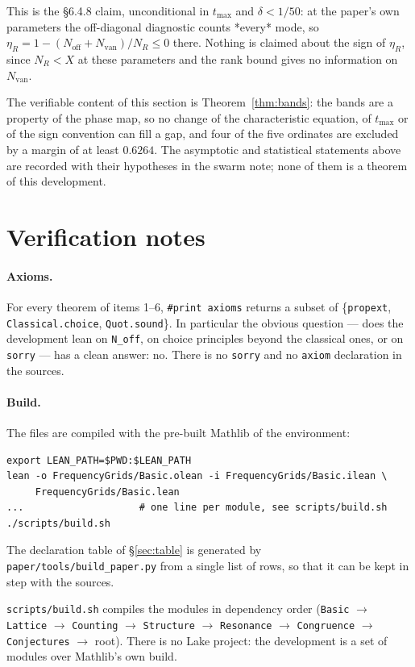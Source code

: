 \documentclass[11pt,a4paper]{article}
\newcommand{\lb}{\_\allowbreak}
\newcommand{\code}[1]{\texttt{#1}}
\theoremstyle{definition}
\theoremstyle{remark}
\begin{document}
\noindent
This is the §6.4.8 claim, unconditional in $t_{\max}$ and $\delta < 1/50$: at the paper's own
parameters the off-diagonal diagnostic counts *every* mode, so $\eta_R = 1 - (N_{\mathrm{off}} +
N_{\mathrm{van}})/N_R \le 0$ there.  Nothing is claimed about the sign of $\eta_R$, since
$N_R < X$ at these parameters and the rank bound gives no information on $N_{\mathrm{van}}$.

\noindent
The verifiable content of this section is Theorem~\ref{thm:bands}: the bands are a property of the
phase map, so no change of the characteristic equation, of $t_{\max}$ or of the sign convention can
fill a gap, and four of the five ordinates are excluded by a margin of at least $0.6264$. The
asymptotic and statistical statements above are recorded with their hypotheses in the swarm note;
none of them is a theorem of this development.

\section{Verification notes}\label{sec:verif}

\paragraph{Axioms.} For every theorem of items 1--6, \code{\#print axioms} returns a subset
of \{\code{propext}, \code{Classical.choice}, \code{Quot.sound}\}.  In particular the
obvious question --- does the development lean on \code{N\lb off}, on choice principles
beyond the classical ones, or on \code{sorry} --- has a clean answer: no.  There is no
\code{sorry} and no \code{axiom} declaration in the sources.

\paragraph{Build.} The files are compiled with the pre-built Mathlib of the environment:
\begin{verbatim}
export LEAN_PATH=$PWD:$LEAN_PATH
lean -o FrequencyGrids/Basic.olean -i FrequencyGrids/Basic.ilean \
     FrequencyGrids/Basic.lean
...                    # one line per module, see scripts/build.sh
./scripts/build.sh
\end{verbatim}
The declaration table of \S\ref{sec:table} is generated by
\code{paper/tools/build\lb paper.py} from a single list of rows, so that it can be kept in
step with the sources.

\code{scripts/build.sh} compiles the modules in dependency order
(\code{Basic} $\to$ \code{Lattice} $\to$ \code{Counting} $\to$ \code{Structure} $\to$
\code{Resonance} $\to$ \code{Congruence} $\to$ \code{Conjectures} $\to$ root).  There is no
Lake project: the development is a set of modules over Mathlib's own build.
\end{document}

